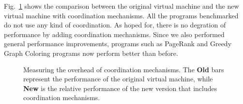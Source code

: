 Fig.~\ref{results:comparison1} shows the comparison between the original virtual
machine and the new virtual machine with coordination mechanisms. All the
programs benchmarked do not use any kind of coordination. As hoped for, there
is no degration of performance by adding coordination mechanisms. Since we also
performed general performance improvements, programs such as PageRank and Greedy
Graph Coloring programs now perform better than before.

\begin{figure}[h!]
   \begin{center}
   \end{center}
   \caption{Measuring the overhead of coordination mechanisms. The \textbf{Old}
   bars represent the performance of the original virtual machine, while
   \textbf{New} is the relative performance of the new version that includes
   coordination mechanisms.}
   \label{results:comparison1}
\end{figure}
